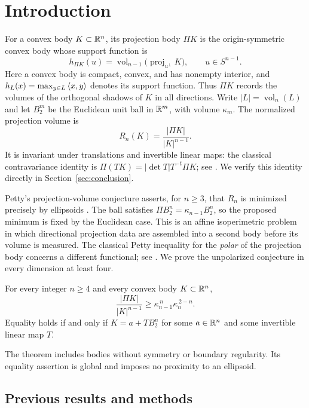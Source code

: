 \section{Introduction}
\label{sec:introduction}

For a convex body $K\subset\mathbb R^n$, its projection body $\Pi K$ is the
origin-symmetric convex body whose support function is
\[
 h_{\Pi K}(u)=\operatorname{vol}_{n-1}
       \bigl(\operatorname{proj}_{u^\perp}K\bigr),
       \qquad u\in S^{n-1}.
\]
Here a convex body is compact, convex, and has nonempty interior, and
$h_L(x)=\max_{y\in L}\left\langle x,y\right\rangle$ denotes its support function.
Thus $\Pi K$ records the volumes of the orthogonal shadows of $K$ in
all directions. Write $|L|=\operatorname{vol}_n(L)$ and let $B_2^m$
be the Euclidean unit ball in $\mathbb R^m$, with volume $\kappa_m$.
The normalized projection volume is
\[
 R_n(K)=\frac{|\Pi K|}{|K|^{n-1}}.
\]
It is invariant under translations and invertible linear maps: the
classical contravariance identity is
$\Pi(TK)=|\det T|T^{-t}\Pi K$; see
\cite[Equation~(1)]{Ludwig2002}. We verify this identity directly in
Section~\ref{sec:conclusion}.

Petty's projection-volume conjecture asserts, for $n\ge3$, that
$R_n$ is minimized precisely by ellipsoids \cite{Petty1971}.
The ball satisfies $\Pi B_2^n=\kappa_{n-1}B_2^n$, so the proposed
minimum is fixed by the Euclidean case. This is an affine isoperimetric
problem in which directional projection data are assembled into a
second body before its volume is measured. The classical Petty
inequality for the \emph{polar} of the projection body concerns a
different functional; see \cite[Section~18.6]{Gardner2002}.
We prove the unpolarized conjecture in every dimension at least four.

\begin{theorem}\label{thm:main}
For every integer $n\ge4$ and every convex body $K\subset\mathbb R^n$,
\begin{equation}\label{eq:main}
 \frac{|\Pi K|}{|K|^{n-1}}
 \ge \kappa_{n-1}^{\,n}\kappa_n^{\,2-n}.
\end{equation}
Equality holds if and only if $K=a+TB_2^n$ for some $a\in\mathbb R^n$ and some
invertible linear map $T$.
\end{theorem}

The theorem includes bodies without symmetry or boundary regularity.
Its equality assertion is global and imposes no proximity to an
ellipsoid.

\subsection*{Previous results and methods}


